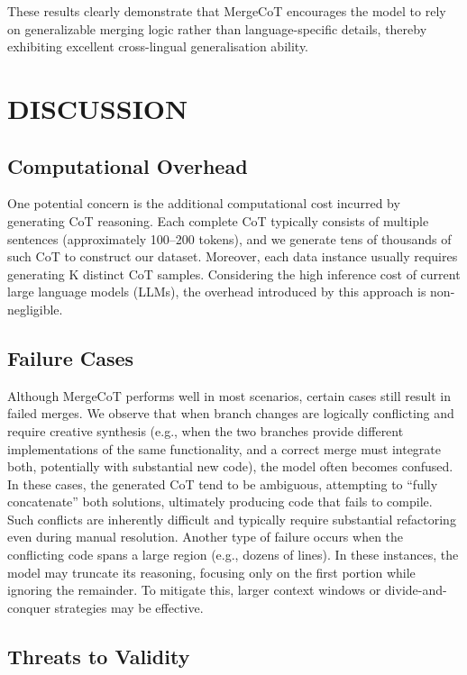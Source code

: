 \documentclass[sigconf,review,anonymous]{acmart}
\begin{document}
These results clearly demonstrate that MergeCoT encourages the model to rely on generalizable merging logic rather than language-specific details, thereby exhibiting excellent cross-lingual generalisation ability.

\section{DISCUSSION}
\subsection{Computational Overhead}
One potential concern is the additional computational cost incurred by generating CoT reasoning. Each complete CoT typically consists of multiple sentences (approximately 100–200 tokens), and we generate tens of thousands of such CoT to construct our dataset. Moreover, each data instance usually requires generating K distinct CoT samples. Considering the high inference cost of current large language models (LLMs), the overhead introduced by this approach is non-negligible.

\subsection{Failure Cases}

Although MergeCoT performs well in most scenarios, certain cases still result in failed merges. We observe that when branch changes are logically conflicting and require creative synthesis (e.g., when the two branches provide different implementations of the same functionality, and a correct merge must integrate both, potentially with substantial new code), the model often becomes confused. In these cases, the generated CoT tend to be ambiguous, attempting to “fully concatenate” both solutions, ultimately producing code that fails to compile. Such conflicts are inherently difficult and typically require substantial refactoring even during manual resolution.
Another type of failure occurs when the conflicting code spans a large region (e.g., dozens of lines). In these instances, the model may truncate its reasoning, focusing only on the first portion while ignoring the remainder. To mitigate this, larger context windows or divide-and-conquer strategies may be effective.

\subsection{Threats to Validity}
\end{document}

